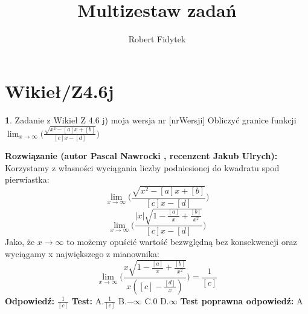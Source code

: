 \documentclass[12pt, a4paper]{article}
\title{Multizestaw zadań}
\author{Robert Fidytek}
\date{}
\theoremstyle{definition} %
\newtheorem{zad}{}
\newcommand{\kategoria}[1]{\section{#1}} %
\newcommand{\zadStart}[1]{\begin{zad}#1\newline} %
\newcommand{\zadStop}{\end{zad}}   %
\newcommand{\rozwStart}[2]{\noindent \textbf{Rozwiązanie (autor #1 , recenzent #2): }\newline} %
\newcommand{\rozwStop}{\newline}                                            %
\newcommand{\odpStart}{\noindent \textbf{Odpowiedź:}\newline}    %
\newcommand{\odpStop}{\newline}                                             %
\newcommand{\testStart}{\noindent \textbf{Test:}\newline} %
\newcommand{\testStop}{\newline} %
\newcommand{\kluczStart}{\noindent \textbf{Test poprawna odpowiedź:}\newline} %
\newcommand{\kluczStop}{\newline} %
\begin{document}
\maketitle


\kategoria{Wikieł/Z4.6j}
\zadStart{Zadanie z Wikieł Z 4.6 j) moja wersja nr [nrWersji]}
Obliczyć granice funkcji $\displaystyle{\lim_{x \to \infty}}\bigg(\frac{\sqrt{x^2-[a]x+[b]}}{[c]x-[d]}\bigg)$
\zadStop
\rozwStart{Pascal Nawrocki}{Jakub Ulrych}
Korzystamy z własności wyciągania liczby podniesionej do kwadratu spod pierwiastka:
$$\displaystyle{\lim_{x \to \infty}}\bigg(\frac{\sqrt{x^2-[a]x+[b]}}{[c]x-[d]}\bigg)$$
$$\displaystyle{\lim_{x \to \infty}}\bigg(\frac{|x|\sqrt{1-\frac{[a]}{x}+\frac{[b]}{x^2}}}{[c]x-[d]}\bigg)$$
Jako, że $x \to \infty$ to możemy opuścić wartość bezwględną bez konsekwencji oraz wyciągamy x największego z mianownika:
$$\displaystyle{\lim_{x \to \infty}}\bigg(\frac{x\sqrt{1-\frac{[a]}{x}+\frac{[b]}{x^2}}}{x([c]-\frac{[d]}{x})}\bigg)=\frac{1}{[c]}$$
\rozwStop
\odpStart
$\frac{1}{[c]}$
\odpStop
\testStart
A.$\frac{1}{[c]}$
B.$-\infty$
C.$0$
D.$\infty$
\testStop
\kluczStart
A
\kluczStop
\end{document}
